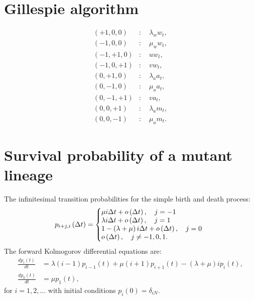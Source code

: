 \documentclass[11pt,a4paper]{article}
\begin{document}



\appendix

\section{Gillespie algorithm}
\begin{subequations}
\begin{flalign}
(+1,0,0)&:\quad \lambda_ww_t,\\
(-1,0,0)&:\quad \mu_ww_t,\\
(-1,+1,0)&:\quad uw_t,\\
(-1,0,+1)&:\quad vw_t,\\
(0,+1,0)&:\quad \lambda_aa_t,\\
(0,-1,0)&:\quad \mu_aa_t,\\
(0,-1,+1)&:\quad va_t,\\
(0,0,+1)&:\quad \lambda_am_t,\\
(0,0,-1)&:\quad \mu_am_t.
\end{flalign}
\end{subequations}

\section{Survival probability of a mutant lineage}\label{AppendixSurvLin}
The infinitesimal transition probabilities for the simple birth and death process:
\begin{align*}
p_{i+j,i}\left(\Delta t\right)=\left\{
  \begin{array}{@{}ll@{}}
  \mu i\Delta t+o\left(\Delta t\right),\quad j=-1 \\
  \lambda i\Delta t+o\left(\Delta t\right),\quad j=1 \\
    1-\left(\lambda+\mu\right) i\Delta t+o\left(\Delta t\right),\quad j=0 \\
   o\left(\Delta t\right),\quad j\neq-1,0,1.
  \end{array}\right.
\end{align*}
The forward Kolmogorov differential equations are:
\begin{subequations}
\label{KolmeqSurv}
\begin{flalign}
\frac{dp_i\left(t\right)}{dt}&=\lambda\left(i-1\right)p_{i-1}\left(t\right)+\mu\left(i+1\right)p_{i+1}\left(t\right)-\left(\lambda+\mu\right)ip_i\left(t\right),\\
\frac{dp_0\left(t\right)}{dt}&=\mu p_1\left(t\right),
\end{flalign}
\end{subequations}
for $i=1,2,\dots$ with initial conditions $p_i\left(0\right)=\delta_{iN}$.
\end{document}
